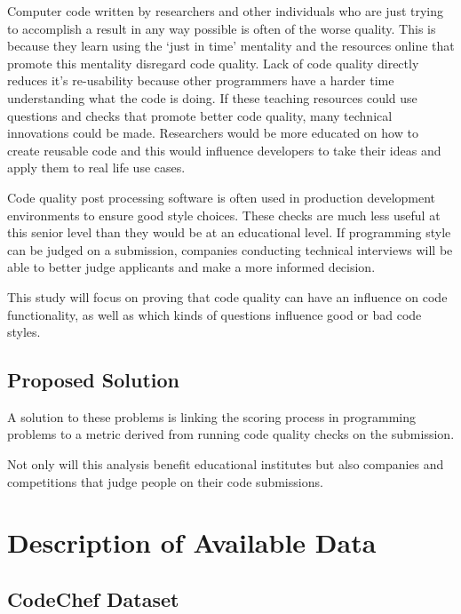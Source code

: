 \documentclass{article}
\begin{document}
Computer code written by researchers and other individuals who are just
trying to accomplish a result in any way possible is often of the worse
quality. This is because they learn using the `just in time' mentality
and the resources online that promote this mentality disregard code
quality. \citet{justintimeteaching} Lack of code quality directly
reduces it's re-usability because other programmers have a harder time
understanding what the code is doing. If these teaching resources could
use questions and checks that promote better code quality, many
technical innovations could be made. Researchers would be more educated
on how to create reusable code and this would influence developers to
take their ideas and apply them to real life use cases.
\citet{reusability}

Code quality post processing software is often used in production
development environments to ensure good style choices. These checks are
much less useful at this senior level than they would be at an
educational level. If programming style can be judged on a submission,
companies conducting technical interviews will be able to better judge
applicants and make a more informed decision.

This study will focus on proving that code quality can have an influence
on code functionality, as well as which kinds of questions influence
good or bad code styles.

\subsection{Proposed Solution}\label{proposed-solution}

A solution to these problems is linking the scoring process in
programming problems to a metric derived from running code quality
checks on the submission.

Not only will this analysis benefit educational institutes but also
companies and competitions that judge people on their code submissions.

\section{Description of Available
Data}\label{description-of-available-data}

\subsection{CodeChef Dataset}\label{codechef-dataset}
\end{document}
